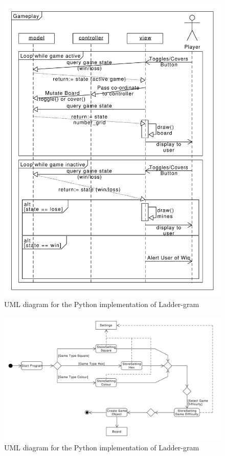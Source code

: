 \documentclass[12pt, a4]{report}
\begin{document}
\begin{figure}[!h]
	\centering
	\includegraphics[scale=0.7]{SequenceDiagram}
	\caption{UML diagram for the Python implementation of Ladder-gram}
\end{figure}
\begin{figure}[!h]
	\centering
	\includegraphics[scale=0.5]{ActivityDiagram}
	\caption{UML diagram for the Python implementation of Ladder-gram}
\end{figure}
\end{document}

